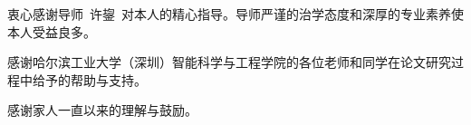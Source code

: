 \documentclass[fontset=fandol,type=master,campus=shenzhen,etitleauto=true]{hithesisbook}
\begin{document}
\authorization

\begin{acknowledgements}
衷心感谢导师~许鋆~对本人的精心指导。导师严谨的治学态度和深厚的专业素养使本人受益良多。

感谢哈尔滨工业大学（深圳）智能科学与工程学院的各位老师和同学在论文研究过程中给予的帮助与支持。

感谢家人一直以来的理解与鼓励。
\end{acknowledgements}
\end{document}
